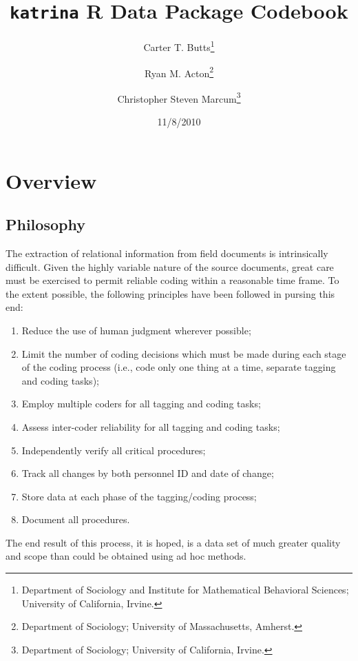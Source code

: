 \documentclass[11pt]{article}
\begin{document}
\title{\texttt{katrina} R Data Package Codebook}
\author{Carter T. Butts\footnote{Department of Sociology and Institute for Mathematical Behavioral Sciences; University of California, Irvine.} \and Ryan M. Acton\footnote{Department of Sociology; University of Massachusetts, Amherst.} \and Christopher Steven Marcum\footnote{Department of Sociology; University of California, Irvine.}}
\date{11/8/2010}
\maketitle

\section{Overview}

\subsection{Philosophy}
The extraction of relational information from field documents is intrinsically difficult. Given the highly variable nature of the source documents, great care must be exercised to permit reliable coding within a reasonable time frame. To the extent possible, the following principles have been followed in pursing this end:
\begin{enumerate}
\item Reduce the use of human judgment wherever possible;
\item Limit the number of coding decisions which must be made during each stage of the coding process (i.e., code only one thing at a time, separate tagging and coding tasks);
\item Employ multiple coders for all tagging and coding tasks;
\item Assess inter-coder reliability for all tagging and coding tasks;
\item Independently verify all critical procedures;
\item Track all changes by both personnel ID and date of change;
\item Store data at each phase of the tagging/coding process;
\item Document all procedures.
\end{enumerate}
The end result of this process, it is hoped, is a data set of much greater quality and scope than could be obtained using ad hoc methods.
\end{document}
